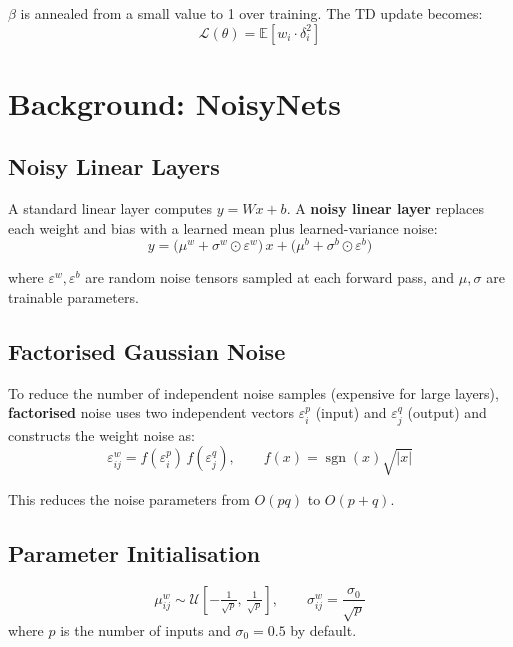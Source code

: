 \documentclass[12pt]{article}
\begin{document}
$\beta$ is annealed from a small value to 1 over training. The TD update becomes:
\begin{equation}
  \mathcal{L}(\theta) = \mathbb{E}\!\left[w_i \cdot \delta_i^2\right]
\end{equation}

\section{Background: NoisyNets}

\subsection{Noisy Linear Layers}

A standard linear layer computes $y = Wx + b$.
A \textbf{noisy linear layer} replaces each weight and bias with a learned mean plus
learned-variance noise:
\begin{equation}
  y = \bigl(\mu^w + \sigma^w \odot \varepsilon^w\bigr)\,x
    + \bigl(\mu^b + \sigma^b \odot \varepsilon^b\bigr)
\end{equation}

where $\varepsilon^w, \varepsilon^b$ are random noise tensors sampled at each forward pass,
and $\mu, \sigma$ are trainable parameters.

\subsection{Factorised Gaussian Noise}

To reduce the number of independent noise samples (expensive for large layers),
\textbf{factorised} noise uses two independent vectors $\varepsilon_i^p$ (input) and
$\varepsilon_j^q$ (output) and constructs the weight noise as:
\begin{equation}
  \varepsilon^w_{ij} = f(\varepsilon_i^p)\, f(\varepsilon_j^q),
  \qquad
  f(x) = \operatorname{sgn}(x)\sqrt{|x|}
\end{equation}

This reduces the noise parameters from $O(pq)$ to $O(p + q)$.

\subsection{Parameter Initialisation}

\[
  \mu^w_{ij} \sim \mathcal{U}\!\left[-\tfrac{1}{\sqrt{p}},\, \tfrac{1}{\sqrt{p}}\right],
  \qquad
  \sigma^w_{ij} = \frac{\sigma_0}{\sqrt{p}}
\]
where $p$ is the number of inputs and $\sigma_0 = 0.5$ by default.
\end{document}
